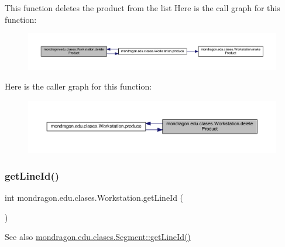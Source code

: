 This function deletes the product from the list Here is the call graph for this function\+:\nopagebreak
\begin{figure}[H]
\begin{center}
\leavevmode
\includegraphics[width=350pt]{classmondragon_1_1edu_1_1clases_1_1_workstation_a00808df804a59149feaa317c146bb5d7_cgraph}
\end{center}
\end{figure}
Here is the caller graph for this function\+:\nopagebreak
\begin{figure}[H]
\begin{center}
\leavevmode
\includegraphics[width=350pt]{classmondragon_1_1edu_1_1clases_1_1_workstation_a00808df804a59149feaa317c146bb5d7_icgraph}
\end{center}
\end{figure}
\mbox{\label{classmondragon_1_1edu_1_1clases_1_1_workstation_af52377c8c57aa8eb17b9aa8e032ce77c}} 
\subsubsection{\texorpdfstring{getLineId()}{getLineId()}}
{\footnotesize\ttfamily int mondragon.\+edu.\+clases.\+Workstation.\+get\+Line\+Id (\begin{DoxyParamCaption}{ }\end{DoxyParamCaption})\hspace{0.3cm}{\ttfamily [inline]}}

\begin{DoxySeeAlso}{See also}
\mbox{\hyperlink{classmondragon_1_1edu_1_1clases_1_1_segment_af905b954e40e0c3d5b58673b03b972cc}{mondragon.\+edu.\+clases.\+Segment\+::get\+Line\+Id()}} 
\end{DoxySeeAlso}
\mbox{\label{classmondragon_1_1edu_1_1clases_1_1_workstation_a4f30271abefe9895917bc2550224bae0}} 
